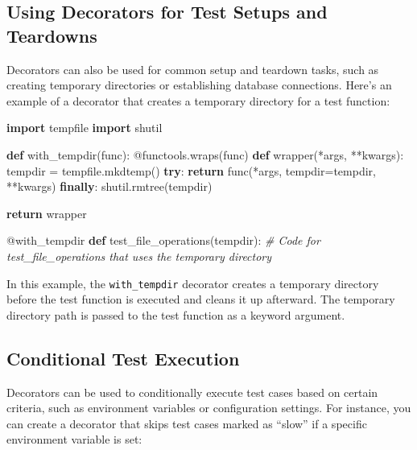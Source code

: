 \documentclass[
  paper=a4,
  ,captions=tableheading
]{scrartcl}
\newenvironment{Shaded}{}{}
\newcommand{\AttributeTok}[1]{\textcolor[rgb]{0.49,0.56,0.16}{#1}}
\newcommand{\CommentTok}[1]{\textcolor[rgb]{0.38,0.63,0.69}{\textit{#1}}}
\newcommand{\ControlFlowTok}[1]{\textcolor[rgb]{0.00,0.44,0.13}{\textbf{#1}}}
\newcommand{\ImportTok}[1]{\textcolor[rgb]{0.00,0.50,0.00}{\textbf{#1}}}
\newcommand{\KeywordTok}[1]{\textcolor[rgb]{0.00,0.44,0.13}{\textbf{#1}}}
\newcommand{\NormalTok}[1]{#1}
\newcommand{\OperatorTok}[1]{\textcolor[rgb]{0.40,0.40,0.40}{#1}}
\begin{document}
\hypertarget{using-decorators-for-test-setups-and-teardowns}{%
\subsection{Using Decorators for Test Setups and
Teardowns}\label{using-decorators-for-test-setups-and-teardowns}}

Decorators can also be used for common setup and teardown tasks, such as
creating temporary directories or establishing database connections.
Here's an example of a decorator that creates a temporary directory for
a test function:

\begin{Shaded}
\begin{Highlighting}[]

\ImportTok{import}\NormalTok{ tempfile}
\ImportTok{import}\NormalTok{ shutil}

\KeywordTok{def}\NormalTok{ with\_tempdir(func):}
    \AttributeTok{@functools.wraps}\NormalTok{(func)}
    \KeywordTok{def}\NormalTok{ wrapper(}\OperatorTok{*}\NormalTok{args, }\OperatorTok{**}\NormalTok{kwargs):}
\NormalTok{        tempdir }\OperatorTok{=}\NormalTok{ tempfile.mkdtemp()}
        \ControlFlowTok{try}\NormalTok{:}
            \ControlFlowTok{return}\NormalTok{ func(}\OperatorTok{*}\NormalTok{args, tempdir}\OperatorTok{=}\NormalTok{tempdir, }\OperatorTok{**}\NormalTok{kwargs)}
        \ControlFlowTok{finally}\NormalTok{:}
\NormalTok{            shutil.rmtree(tempdir)}

    \ControlFlowTok{return}\NormalTok{ wrapper}

\AttributeTok{@with\_tempdir}
\KeywordTok{def}\NormalTok{ test\_file\_operations(tempdir):}
    \CommentTok{\# Code for test\_file\_operations that uses the temporary directory}
\end{Highlighting}
\end{Shaded}

In this example, the \texttt{with\_tempdir} decorator creates a
temporary directory before the test function is executed and cleans it
up afterward. The temporary directory path is passed to the test
function as a keyword argument.

\hypertarget{conditional-test-execution}{%
\subsection{Conditional Test
Execution}\label{conditional-test-execution}}

Decorators can be used to conditionally execute test cases based on
certain criteria, such as environment variables or configuration
settings. For instance, you can create a decorator that skips test cases
marked as ``slow'' if a specific environment variable is set:
\end{document}

